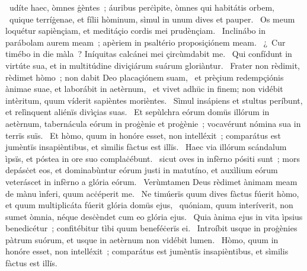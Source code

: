 \psalmChapterWithInscription{}
{ }
{%
~udíte haec, òmnes ġèntes~; áuribus perċìpite, òmnes qui habitátis orbem, 
~quique terríġenae, et fílii hòminum, sìmul in unum dives et pauper. 
~Os meum loquétur sapiènçiam, et meditáçio cordis mei prudènçiam. 
~Inclinábo in parábolam aurem meam~; apèriem in psaltério proposiçiónem meam. 
~¿~Cur timébo in die màla~? Iníquitas calcánei mei çircùmdabit me. 
~Qui confídunt in virtúte sua, et in multitúdine diviçiárum suárum gloriàntur. 
~Frater non rèdimit, rèdimet hòmo~; non dabit Deo placaçiónem suam, 
~et prèçium redempçiónis ànimae suae, et laborábit in aetèrnum, 
~et vivet adhüc in finem; non vidébit intèritum, quum víderit sapièntes morièntes. 
~Sìmul insápiens et stultus períbunt, et relìnquent aliénïs divìçias suas. 
~Et sepùlchra eórum domüs illórum in aetèrnum, tabernácula eórum in proġènie et proġènie~; vocavérunt nómina sua in terrïs suïs. 
~Et hòmo, quum in honóre esset, non intelléxit~; comparátus est jumèntïs insapièntibus, et sìmilis fàctus est illïs. 
~Haec via illórum scándalum ìpsïs, et póstea in ore suo complaċébunt. 
~sicut oves in infèrno pósiti sunt~; mors depásċet eos, et dominabùntur eórum justi in matutíno, et auxìlium eórum veteráscet in infèrno a glória eórum. 
~Verùmtamen Deus rèdimet ànimam meam de mànu ìnferi, quum acċéperit me. 
~Ne timúerïs quum dives fàctus fúerit hòmo, et quum multiplicáta fúerit glória domüs ejus, 
~quóniam, quum interíverit, non sumet òmnia, néque desċèndet cum eo glória ejus. 
~Quia ànima ejus in vita ìpsius benedicétur~; confitébitur tìbi quum beneféċerïs ei. 
~Introíbit usque in proġènies pàtrum suórum, et usque in aetèrnum non vidébit lumen. 
~Hòmo, quum in honóre esset, non intelléxit~; comparátus est jumèntïs insapièntibus, et sìmilis fàctus est illïs. 
}
